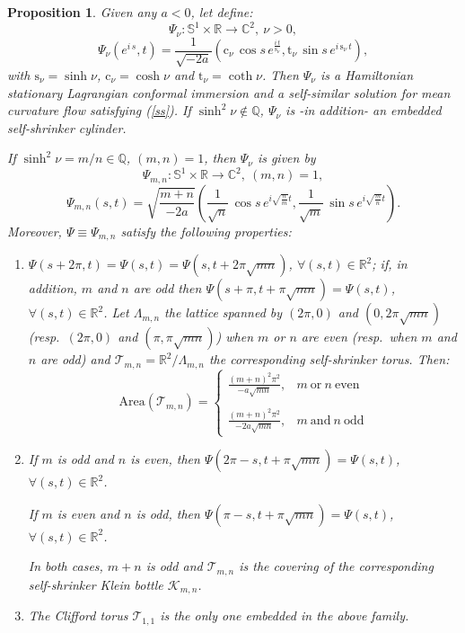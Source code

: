 \documentclass[leqno,11pt]{amsart}
\newtheorem{proposition}{Proposition}
\begin{document}
\begin{proposition}\label{ex2}
Given any $a < 0$, let define:
$$\Psi_\nu:{\mathbb{S}}^1 \times {\mathbb{R}} \rightarrow {\mathbb{C}}^2, \ \nu >0,$$
\begin{equation}\label{Phic}
\Psi_\nu(e^{i\,s},t)= \frac{1}{\sqrt{-2a}} \left( \mathrm{c}_\nu\,
\cos s\,e^{\frac{i\,t}{\mathrm{s}_\nu}},\mathrm{t}_\nu \, \sin
s\,e^{i\, \mathrm{s}_\nu \,t}\right),
\end{equation}
with $\mathrm{s}_\nu=\sinh \nu $, $\mathrm{c}_\nu=\cosh \nu$ and
$\mathrm{t}_\nu=\coth \nu$. Then $\Psi_\nu$ is a Hamiltonian
stationary Lagrangian conformal immersion and a self-similar
solution for mean curvature flow satisfying (\ref{ss}). If
$\sinh^2 \nu \notin {\mathbb{Q}}$, $\Psi_\nu$ is -in addition- an embedded
self-shrinker cylinder.

If $\sinh^2 \nu = m/n \in {\mathbb{Q}}$, $(m,n)=1$, then
$\Psi_\nu$ is given by 
$$\Psi_{m,n}:{\mathbb{S}}^1 \times {\mathbb{R}} \rightarrow {\mathbb{C}}^2, \ (m,n)=1, $$
\begin{equation}\label{Phimn}
\Psi_{m,n}(s,t)=\sqrt{\frac{m+n}{-2a}} \left(
\frac{1}{\sqrt{n}}\,\cos s\,e^{i \sqrt{\frac{n}{m}}t} ,
\frac{1}{\sqrt{m}}\,\sin s\,e^{i \sqrt{\frac{m}{n}}t} \right).
\end{equation}
Moreover, $\Psi\equiv\Psi_{m,n}$ satisfy the following properties:
\begin{enumerate}
\item $\Psi (s+2\pi, t)=\Psi (s,t) =\Psi (s,t+2\pi\sqrt{mn})
$, $\forall (s,t)\in{\mathbb{R}}^2$; if, in addition, $m$ and $n$ are odd
then $\Psi (s+\pi,t+\pi\sqrt{mn})=\Psi (s,t)$, $\forall
(s,t)\in{\mathbb{R}}^2$. Let $\Lambda_{m,n}$ the lattice spanned by
$(2\pi,0)$ and $(0,2\pi\sqrt{mn})$ (resp.\ $(2\pi,0)$ and
$(\pi,\pi\sqrt{mn})$) when $m$ or $n$ are even (resp.\ when $m$
and $n$ are odd) and $\mathcal{T}_{m,n}={\mathbb{R}}^2 / \Lambda_{m,n}$ the
corresponding self-shrinker torus. Then:
$$ \mathrm{Area}(\mathcal{T}_{m,n})=\left\{ \begin{array}{ll}
\frac{(m+n)^2 \pi^2}{-a \sqrt{mn}}, & m \mathrm{\ or \ } n  \mathrm{\ even} \\ \\
\frac{(m+n)^2 \pi^2}{-2a \sqrt{mn}}, & m \mathrm{\ and \ } n
\mathrm{\ odd}
\end{array}\right.
$$
\item If $m$ is odd and $n$ is even, then $\Psi (2\pi -s,t+\pi\sqrt{mn})=\Psi (s,t)$,
$\forall (s,t)\in{\mathbb{R}}^2$.

If $m$ is even and $n$ is odd, then $\Psi (\pi
-s,t+\pi\sqrt{mn})=\Psi (s,t)$,
$\forall (s,t)\in{\mathbb{R}}^2$.

In both cases, $m+n$ is odd and $\mathcal{T}_{m,n}$ is the
covering of the corresponding self-shrinker Klein bottle
$\mathcal{K}_{m,n}$.
\item The Clifford torus $\mathcal{T}_{1,1} $ is the only one embedded in the above family.
\end{enumerate}
\end{proposition}
\end{document}
